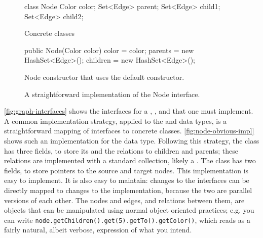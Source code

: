 \begin{figure}
\centering
\begin{subfloat}
\begin{minipage}[b]{0.3\textwidth}
\begin{figurelisting}
class Node {
   Color color;
   Set<Edge> parent;
   Set<Edge> child1;
   Set<Edge> child2;
}
\end{figurelisting}
\end{minipage}
\caption{Concrete classes}
\end{subfloat}
\quad
\begin{subfloat}
\begin{minipage}[b]{0.5\textwidth}
\begin{figurelisting}
public Node(Color color) {
   color = color;
   parents = new HashSet<Edge>();
   children = new HashSet<Edge>();
}
\end{figurelisting}
\end{minipage}
\caption{Node constructor that uses the default  constructor.}
\label{fig:node-obvious-constructor}
\end{subfloat}
\caption{A straightforward implementation of the Node interface.}
\label{fig:node-obvious-impl}
\end{figure}

\autoref{fig:graph-interfaces} shows the interfaces for a ,
, and  that one must implement. A common implementation
strategy, applied to the  and  data types, is a
straightforward mapping of interfaces to concrete classes.
\autoref{fig:node-obvious-impl} shows such an implementation for the
 data type. Following this
strategy, the  class has three fields, to store its 
and the relations to children and parents; these relations are implemented with a
standard collection, likely a . The  class has two
fields, to store pointers to the source and target nodes. This implementation is
easy to implement. It is also easy to maintain: changes to the interfaces can be
directly mapped to changes to the implementation, because the two are parallel
versions of each other. The nodes and edges, and relations between them, are
objects that can be manipulated using normal object oriented practices; e.g. you
can write \texttt{node.getChildren().get(5).getTo()\-.getColor()}, which reads
as a fairly natural, albeit verbose, expression of what you intend.


